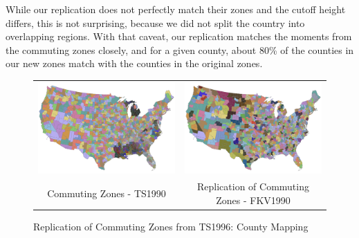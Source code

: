 While our replication does not perfectly match their zones and the cutoff height differs, this is not surprising, because we did not split the country into overlapping regions. With that caveat, our replication matches the moments from the commuting zones closely, and for a given county, about 80\% of the counties in our new zones match with the counties in the original zones.
\begin{figure}[tbh]\centering
\begin{tabular}{cc}
\includegraphics[scale=0.25]{./figures/commutingzones.png}&
\includegraphics[scale=0.25]{./figures/clustermap_jtw1990_x.png}\\
Commuting Zones - TS1990 & Replication of Commuting Zones - FKV1990 \\
\end{tabular}
\caption{Replication of Commuting Zones from TS1996: County Mapping \label{fig:czreplication}}
\end{figure}


